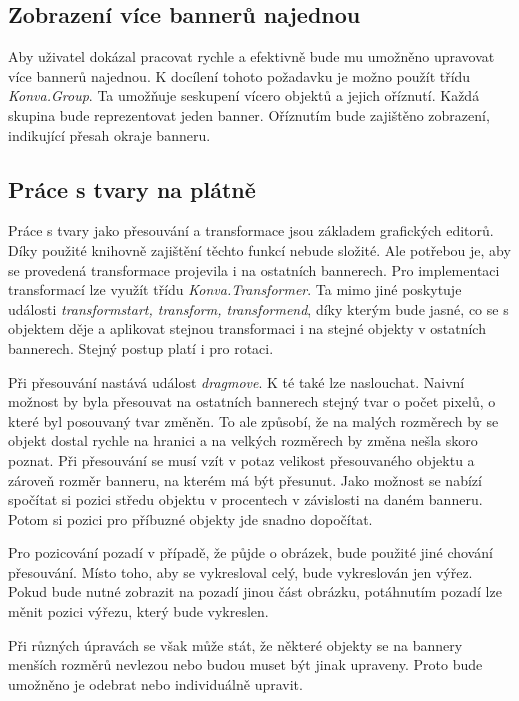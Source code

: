         \subsection{Zobrazení více bannerů najednou}
        Aby uživatel dokázal pracovat rychle a efektivně bude mu umožněno upravovat více bannerů najednou. K docílení tohoto požadavku je možno použít
        třídu \emph{Konva.Group}. Ta umožňuje seskupení vícero objektů a jejich oříznutí.
        Každá skupina bude reprezentovat jeden banner. Oříznutím bude zajištěno zobrazení, indikující přesah okraje banneru.

        \subsection{Práce s tvary na plátně}
        Práce s tvary jako přesouvání a transformace jsou základem grafických editorů. Díky použité knihovně zajištění těchto funkcí nebude složité.
        Ale potřebou je, aby se provedená transformace projevila i na ostatních bannerech. Pro implementaci transformací lze využít třídu \emph{Konva.Transformer}.
        Ta mimo jiné poskytuje události \emph{transformstart, transform, transformend}, díky kterým bude jasné, co se s objektem děje a aplikovat stejnou transformaci i
        na stejné objekty v ostatních bannerech. Stejný postup platí i pro rotaci.

        Při přesouvání nastává událost \emph{dragmove}. K té také lze naslouchat. Naivní možnost by byla přesouvat na ostatních bannerech stejný tvar o počet pixelů,
        o které byl posouvaný tvar změněn. To ale způsobí, že na malých rozměrech by se objekt dostal rychle na hranici a na velkých rozměrech by
        změna nešla skoro poznat. Při přesouvání se musí vzít v potaz velikost přesouvaného objektu a zároveň rozměr banneru, na kterém má být přesunut.
        Jako možnost se nabízí spočítat si pozici středu objektu v procentech v závislosti na daném banneru.
        Potom si pozici pro příbuzné objekty jde snadno dopočítat.

        Pro pozicování pozadí v případě, že půjde o obrázek, bude použité jiné chování přesouvání. Místo toho, aby se vykresloval celý, bude vykreslován jen výřez.
        Pokud bude nutné zobrazit na pozadí jinou část obrázku, potáhnutím pozadí lze měnit pozici výřezu, který bude vykreslen.

        Při různých úpravách se však může stát, že některé objekty se na bannery menších rozměrů nevlezou nebo budou muset být jinak upraveny.
        Proto bude umožněno je odebrat nebo individuálně upravit.

